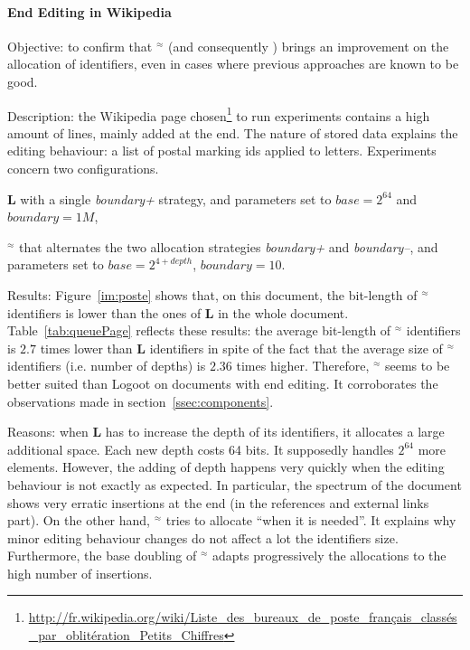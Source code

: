 \paragraph{End Editing in Wikipedia}
\begin{asparadesc}
  
\item[Objective:] to confirm that \textbf{\NAME{}}$^\approx$ (and consequently
  \NAME{}) brings an improvement on the allocation of identifiers, even in
  cases where previous approaches are known to be good.

\item[Description:] the Wikipedia page
  chosen\footnote{\url{http://fr.wikipedia.org/wiki/Liste_des_bureaux_de_poste_français_classés_par_oblitération_Petits_Chiffres}}
  to run experiments contains a high amount of lines, mainly added at the
  end. The nature of stored data explains the editing behaviour: a list of
  postal marking ids applied to letters. Experiments concern two
  configurations.
  \begin{inparaenum}[(1)]
  \item \textbf{L} with a single \emph{boundary+} strategy, and parameters set
    to $base=2^{64}$ and $boundary=1M$,
  \item \textbf{\NAME{}}$^\approx$ that alternates the two allocation
    strategies \emph{boundary+} and \emph{boundary--}, and parameters set to
    $base=2^{4+depth}$, $boundary=10$.
  \end{inparaenum}

\item[Results:] Figure~\ref{im:poste} shows that, on this document, the
  bit-length of \textbf{\NAME{}}$^\approx$ identifiers is lower than the ones
  of \textbf{L} in the whole document. Table~\ref{tab:queuePage} reflects these
  results: the average bit-length of \textbf{\NAME{}}$^\approx$ identifiers is
  $2.7$ times lower than \textbf{L} identifiers in spite of the fact that the
  average size of \textbf{\NAME{}}$^\approx$ identifiers (i.e. number of
  depths) is $2.36$ times higher. Therefore, \textbf{\NAME{}}$^\approx$ seems
  to be better suited than Logoot on documents with end editing. It
  corroborates the observations made in section~\ref{ssec:components}.

\item[Reasons:] when \textbf{L} has to increase the depth of its identifiers,
  it allocates a large additional space. Each new depth costs 64 bits. It
  supposedly handles $2^64$ more elements. However, the adding of depth happens
  very quickly when the editing behaviour is not exactly as expected. In
  particular, the spectrum of the document shows very erratic insertions at the
  end (in the references and external links part). On the other hand,
  \textbf{\NAME{}}$^\approx$ tries to allocate ``when it is needed''. It
  explains why minor editing behaviour changes do not affect a lot the
  identifiers size. Furthermore, the base doubling of
  \textbf{\NAME{}}$^\approx$ adapts progressively the allocations to the high
  number of insertions.
\end{asparadesc}
 
